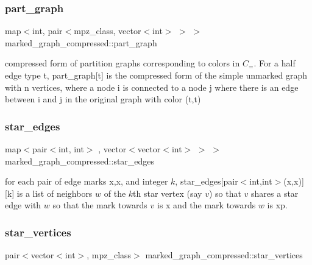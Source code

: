 \subsubsection{\texorpdfstring{part\+\_\+graph}{part\_graph}}
{\footnotesize\ttfamily map$<$int, pair$<$mpz\+\_\+class, vector$<$int$>$ $>$ $>$ marked\+\_\+graph\+\_\+compressed\+::part\+\_\+graph}



compressed form of partition graphs corresponding to colors in $C_=$. For a half edge type t, part\+\_\+graph\mbox{[}t\mbox{]} is the compressed form of the simple unmarked graph with n vertices, where a node i is connected to a node j where there is an edge between i and j in the original graph with color (t,t) 

\mbox{\label{classmarked__graph__compressed_a7df5779d313486644132bd816937f532}} 
\subsubsection{\texorpdfstring{star\+\_\+edges}{star\_edges}}
{\footnotesize\ttfamily map$<$pair$<$int, int$>$ , vector$<$vector$<$int$>$ $>$ $>$ marked\+\_\+graph\+\_\+compressed\+::star\+\_\+edges}



for each pair of edge marks x,x\textquotesingle{}, and integer $k$, star\+\_\+edges\mbox{[}pair$<$int,int$>$(x,x\textquotesingle{})\mbox{]}\mbox{[}k\mbox{]} is a list of neighbors $w$ of the $k$th star vertex (say $v$) so that $v$ shares a star edge with $w$ so that the mark towards $v$ is x and the mark towards $w$ is xp. 

\mbox{\label{classmarked__graph__compressed_a7a4ced4586e2e353f9076bd447df5208}} 
\subsubsection{\texorpdfstring{star\+\_\+vertices}{star\_vertices}}
{\footnotesize\ttfamily pair$<$vector$<$int$>$, mpz\+\_\+class$>$ marked\+\_\+graph\+\_\+compressed\+::star\+\_\+vertices}



